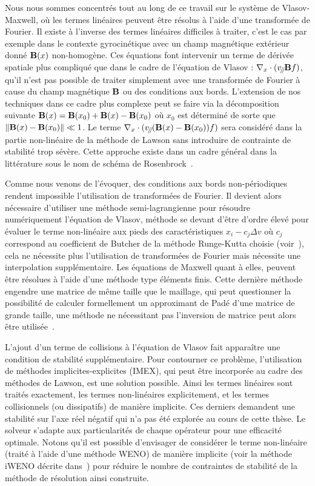 Nous nous sommes concentrés tout au long de ce travail sur le système de Vlasov-Maxwell, où les termes linéaires peuvent être résolus à l'aide d'une transformée de Fourier. Il existe à l'inverse des termes linéaires difficiles à traiter, c'est le cas par exemple dans le contexte gyrocinétique avec un champ magnétique extérieur donné $\vb{B}(x)$ non-homogène. Ces équations font intervenir un terme de dérivée spatiale plus compliqué que dans le cadre de l'équation de Vlasov : $\nabla_{x}\cdot(v_{\mathbin{\!/\mkern-5mu/\!}}\vb{B}f)$, qu'il n'est pas possible de traiter simplement avec une transformée de Fourier à cause du champ magnétique $\vb{B}$ ou des conditions aux bords. L'extension de nos techniques dans ce cadre plus complexe peut se faire via la décomposition suivante $\vb{B}(x)=\vb{B}(x_0)+\vb{B}(x)-\vb{B}(x_0)$ où $x_0$ est déterminé de sorte que $\|\vb{B}(x)-\vb{B}(x_0)\| \ll 1$. Le terme $\nabla_x\cdot (v_{\mathbin{\!/\mkern-5mu/\!}} (\vb{B}(x)-\vb{B}(x_0))f)$ sera considéré dans la partie non-linéaire de la méthode de Lawson sans introduire de contrainte de stabilité trop sévère. Cette approche existe dans un cadre général dans la littérature sous le nom de schéma de Rosenbrock~\cite{Hochbruck:2006,Hochbruck:2009,Luan:2016}.


Comme nous venons de l'évoquer, des conditions aux bords non-périodiques rendent impossible l'utilisation de transformées de Fourier. Il devient alors nécessaire d'utiliser une méthode semi-lagrangienne pour résoudre numériquement l'équation de Vlasov, méthode se devant d'être d'ordre élevé pour évaluer le terme non-linéaire aux pieds des caractéristiques $x_i - c_j\Delta v$ où $c_j$ correspond au coefficient de Butcher de la méthode Runge-Kutta choisie (voir~\cite{Boscarino:2019a}), cela ne nécessite plus l'utilisation de transformées de Fourier mais nécessite une interpolation supplémentaire. Les équations de Maxwell quant à elles, peuvent être résolues à l'aide d'une méthode type éléments finis. Cette dernière méthode engendre une matrice de même taille que le maillage, qui peut questionner la possibilité de calculer formellement un approximant de Padé d'une matrice de grande taille, une méthode ne nécessitant pas l'inversion de matrice peut alors être utilisée~\cite{Li:2011}.

L'ajout d'un terme de collisions à l'équation de Vlasov fait apparaître une condition de stabilité supplémentaire. Pour contourner ce problème, l'utilisation de méthodes implicites-explicites (IMEX), qui peut être incorporée au cadre des méthodes de Lawson, est une solution possible. Ainsi les termes linéaires sont traités exactement, les termes non-linéaires explicitement, et les termes collisionnels (ou dissipatifs) de manière implicite. Ces derniers demandent une stabilité sur l'axe réel négatif qui n'a pas été explorée au cours de cette thèse. Le solveur s'adapte aux particularités de chaque opérateur pour une efficacité optimale. Notons qu'il est possible d'envisager de considérer le terme non-linéaire (traité à l'aide d'une méthode WENO) de manière implicite (voir la méthode iWENO décrite dans~\cite{Gottlieb:2006}) pour réduire le nombre de contraintes de stabilité de la méthode de résolution ainsi construite.

